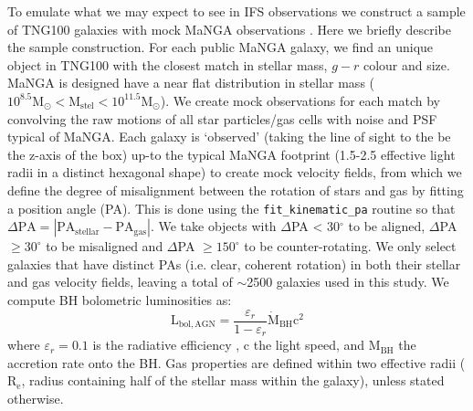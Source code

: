 \documentclass[fleqn,usenatbib]{mnras}
\begin{document}
To emulate what we may expect to see in IFS observations we construct a sample of TNG100 galaxies with mock MaNGA observations \citep[a complete description is given in][]{duckworth2019}. Here we briefly describe the sample construction. 
For each public MaNGA galaxy, we find an unique object in TNG100 with the closest match in stellar mass, $g-r$ colour and size. MaNGA is designed have a near flat distribution in stellar mass ($\mathrm{10^{8.5} M_{\odot} < M_{stel} < 10^{11.5} M_{\odot}}$). We create mock observations for each match by convolving the raw motions of all star particles/gas cells with noise and PSF typical of MaNGA. Each galaxy is `observed' (taking the line of sight to the be the z-axis of the box) up-to the typical MaNGA footprint (1.5-2.5 effective light radii in a distinct hexagonal shape) to create mock velocity fields, from which we define the degree of misalignment between the rotation of stars and gas by fitting a position angle (PA). This is done using the \texttt{fit\_kinematic\_pa} routine \citep[see Appendix C of][]{krajnovic2006} so that $\Delta\mathrm{PA = |PA_{stellar} - PA_{gas}|}$. We take objects with $\Delta$PA < 30$^{\circ}$ to be aligned, $\Delta$PA $ \geq 30^{\circ}$ to be misaligned and $\Delta$PA $\geq 150^{\circ}$ to be counter-rotating. We only select galaxies that have distinct PAs (i.e. clear, coherent rotation) in both their stellar and gas velocity fields, leaving a total of $\sim$2500 galaxies used in this study. We compute BH bolometric luminosities as:
\begin{equation}
\mathrm{L_{bol, AGN}} = \frac{\varepsilon_r}{1 - \varepsilon_r} \mathrm{\dot{M}_{BH} c^2}
\end{equation}
where $\varepsilon_r=0.1$ is the radiative efficiency \citep[see discussion in][]{habouzit2019}, c the light speed, and $\mathrm{M_{BH}}$ the accretion rate onto the BH. Gas properties are defined within two effective radii ($\mathrm{R_{e}}$, radius containing half of the stellar mass within the galaxy), unless stated otherwise.

\vspace{-1em}
\end{document}
